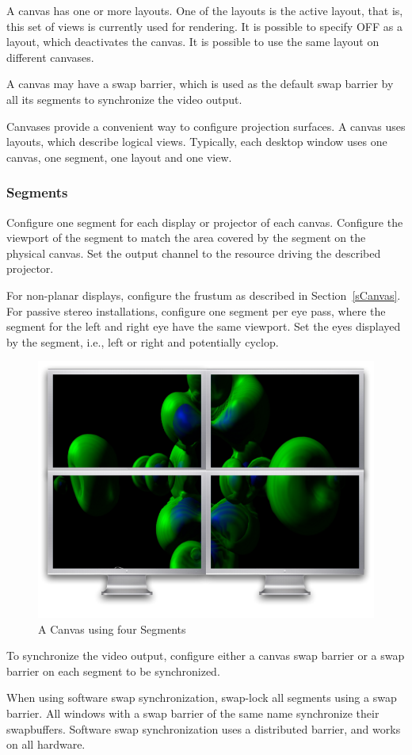 \documentclass[10pt,a4]{scrartcl}
\newcommand{\sref}[1]{Section~\ref{#1}}
\begin{document}
A canvas has one or more layouts. One of the layouts is the active
layout, that is, this set of views is currently used for rendering. It
is possible to specify \textsf{OFF} as a layout, which deactivates the
canvas. It is possible to use the same layout on different canvases.

A canvas may have a swap barrier, which is used as the default swap barrier by
all its segments to synchronize the video output.

Canvases provide a convenient way to configure projection surfaces. A canvas
uses layouts, which describe logical views. Typically, each desktop window uses
one canvas, one segment, one layout and one view.

\subsubsection{Segments}

Configure one \textsf{segment} for each display or projector of each
canvas. Configure the \textsf{viewport} of the segment to match the area
covered by the segment on the physical canvas. Set the output
\textsf{channel} to the resource driving the described projector.

For non-planar displays, configure the frustum as described in
\sref{sCanvas}. For passive stereo installations, configure one segment per eye
pass, where the segment for the left and right eye have the same viewport. Set
the eyes displayed by the segment, i.e., left or right and potentially cyclop.

\begin{figure}
  \includegraphics[width=.382\textwidth]{images/canvas.pdf}
  {\caption{\label{fCanvas}A Canvas using four Segments}}
\end{figure}
To synchronize the video output, configure either a canvas swap barrier or a
swap barrier on each segment to be synchronized.

When using software swap synchronization, swap-lock all segments using a swap
barrier. All windows with a swap barrier of the same name synchronize their
swapbuffers. Software swap synchronization uses a distributed barrier, and works
on all hardware.
\end{document}
